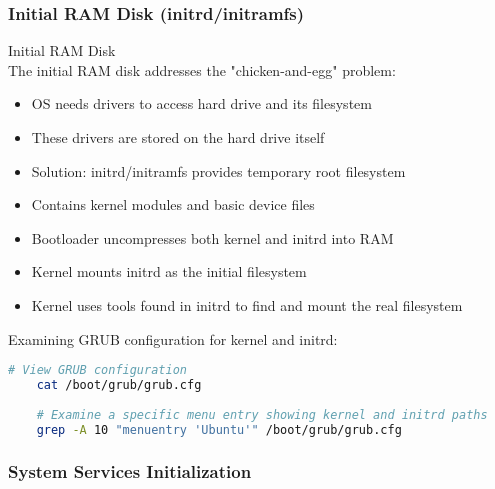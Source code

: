 \multend

\subsubsection{Initial RAM Disk (initrd/initramfs)}

\begin{definition}{Initial RAM Disk}\\
    The initial RAM disk addresses the "chicken-and-egg" problem:
    \begin{itemize}
        \item OS needs drivers to access hard drive and its filesystem
        \item These drivers are stored on the hard drive itself
        \item Solution: initrd/initramfs provides temporary root filesystem
        \item Contains kernel modules and basic device files
        \item Bootloader uncompresses both kernel and initrd into RAM
        \item Kernel mounts initrd as the initial filesystem
        \item Kernel uses tools found in initrd to find and mount the real filesystem
    \end{itemize}
\end{definition}

\begin{example}
    Examining GRUB configuration for kernel and initrd:
    \begin{lstlisting}[language=bash, style=basesmol]
    # View GRUB configuration
    cat /boot/grub/grub.cfg
    
    # Examine a specific menu entry showing kernel and initrd paths
    grep -A 10 "menuentry 'Ubuntu'" /boot/grub/grub.cfg
    \end{lstlisting}
\end{example}

\subsubsection{System Services Initialization}



